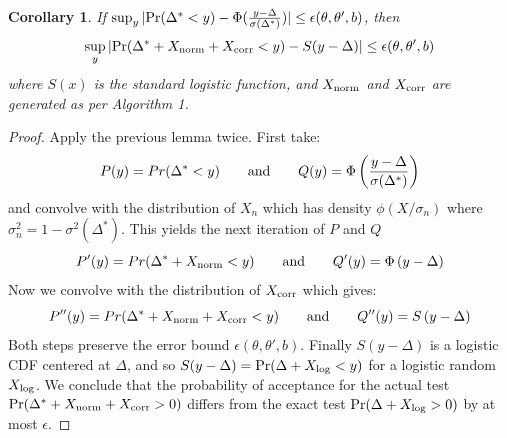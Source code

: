 \documentclass{article}
\newtheorem{corollary}{Corollary}
\begin{document}
\begin{corollary}
  If $\sup_y|{\rm Pr}(\Delta^* < y) - \Phi(\frac{y-\Delta}{\sigma(\Delta^*)})| \leq \epsilon(\theta,\theta',b)$,
  then
  \begin{equation}
    \sup_y|{\rm Pr}(\Delta^*+X_{\rm norm}+X_{\rm corr} < y) - S(y-\Delta)| \leq \epsilon(\theta,\theta',b)
  \end{equation}
  where $S(x)$ is the standard logistic function, and $X_{\rm norm}$ and $X_{\rm corr}$ are generated as per Algorithm 1. 
  \end{corollary}
\begin{proof}
  Apply the previous lemma twice. First take:
  \begin{equation}
    P(y) = Pr(\Delta^* < y) \qquad {\rm and}\qquad Q(y) = \Phi\left(\frac{y-\Delta}{\sigma(\Delta^*)}\right)
  \end{equation}
  and convolve with the distribution of $X_n$ which has density $\phi(X/\sigma_n)$ where $\sigma_n^2
  = 1 - \sigma^2(\Delta^*)$. This yields the next iteration of $P$ and $Q$
  \begin{equation}
    P'(y) = Pr(\Delta^*+X_{\rm norm} < y) \qquad {\rm and}\qquad Q'(y) = \Phi\left({y-\Delta}\right)
  \end{equation}
  Now we convolve with the distribution of $X_{\rm corr}$ which gives:
  \begin{equation}
    P''(y) = Pr(\Delta^*+X_{\rm norm}+X_{\rm corr} < y) \qquad {\rm and}\qquad Q''(y) = S\left({y-\Delta}\right)
  \end{equation}
  Both steps preserve the error bound
  $\epsilon(\theta,\theta',b)$. Finally $S(y-\Delta)$ is a logistic
  CDF centered at $\Delta$, and so $S(y-\Delta) = {\rm Pr}(\Delta +
  X_{\rm log} < y)$ for a logistic random $X_{\rm log}$. We
  conclude that the probability of acceptance for the actual test ${\rm Pr}(\Delta^*+X_{\rm norm}+X_{\rm
    corr} > 0)$ differs from the exact test ${\rm Pr}(\Delta+X_{\rm
    log} > 0)$ by at most $\epsilon$.
  
\end{proof}
\end{document}
